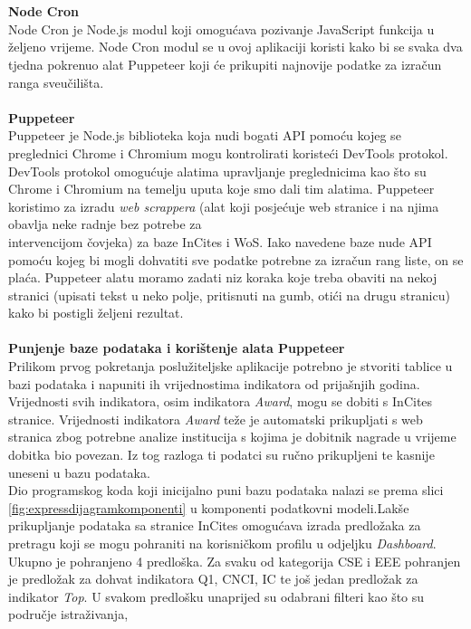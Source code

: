 \documentclass[times, utf8, zavrsni]{fer}
\begin{document}
\\\\\textbf{Node Cron}
\\ Node Cron je Node.js modul koji omogućava pozivanje JavaScript funkcija u željeno vrijeme. Node Cron modul se u ovoj 
aplikaciji koristi kako bi se svaka dva tjedna pokrenuo alat Puppeteer koji će prikupiti najnovije podatke za izračun ranga sveučilišta.
\\ \\ \textbf{Puppeteer}
\\ Puppeteer je Node.js biblioteka koja nudi bogati API pomoću kojeg se preglednici Chrome i Chromium mogu kontrolirati koristeći DevTools protokol.
DevTools protokol omogućuje alatima upravljanje preglednicima kao što su Chrome i Chromium na temelju uputa koje smo dali tim alatima.
Puppeteer koristimo za izradu \emph{web scrappera} (alat koji posjećuje web stranice i 
na njima obavlja neke radnje bez potrebe za \\intervencijom čovjeka) za baze InCites i WoS. Iako navedene baze nude API pomoću kojeg bi mogli 
dohvatiti sve podatke potrebne za izračun rang liste, on se plaća. Puppeteer alatu moramo zadati niz koraka koje treba obaviti na nekoj stranici (upisati tekst u neko polje, pritisnuti na gumb, otići na drugu stranicu)
kako bi postigli željeni rezultat.
\\\\\textbf{Punjenje baze podataka i korištenje alata Puppeteer}
\\Prilikom prvog pokretanja poslužiteljske aplikacije potrebno je stvoriti tablice u bazi podataka i napuniti ih vrijednostima indikatora od prijašnjih godina.
Vrijednosti svih indikatora, osim indikatora \emph{Award}, mogu se dobiti s InCites stranice. Vrijednosti indikatora \emph{Award} teže je automatski prikupljati 
s web stranica zbog potrebne analize institucija s kojima je dobitnik nagrade u vrijeme dobitka bio povezan. Iz tog razloga ti podatci 
su ručno prikupljeni te kasnije uneseni u bazu podataka. 
\\Dio programskog koda koji inicijalno puni bazu podataka nalazi se prema slici \ref{fig:expressdijagramkomponenti} u komponenti podatkovni modeli.Lakše prikupljanje podataka sa stranice InCites omogućava izrada predložaka za pretragu koji se mogu pohraniti 
na korisničkom profilu u odjeljku \emph{Dashboard}. Ukupno je pohranjeno 4 predloška. Za svaku od kategorija CSE i EEE pohranjen je predložak 
za dohvat indikatora Q1, CNCI, IC te još jedan predložak za indikator \emph{Top}. U svakom predlošku unaprijed su odabrani filteri kao što su područje istraživanja,
\end{document}
